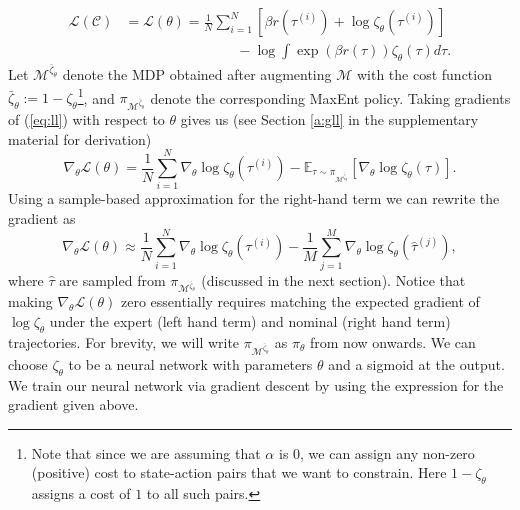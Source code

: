 \documentclass{article}
\begin{document}
\begin{equation}
    \begin{split}
        \mathcal{L}(\mathcal{C})
        &= \mathcal{L}(\theta)
        = \frac{1}{N}\sum_{i=1}^N\left[\beta r(\tau^{(i)}) + \log \zeta_\theta(\tau^{(i)})\right] \\&\qquad\qquad\qquad\qquad-\log\int\exp(\beta r(\tau))\zeta_\theta(\tau)d\tau.
    \end{split}
	\label{eq:ll}
\end{equation}
Let $\mathcal{M}^{\bar{\zeta}_\theta}$ denote the MDP obtained after augmenting $\mathcal{M}$ with the cost function $\bar{\zeta}_\theta := 1-\zeta_\theta$\footnote{Note that since we are assuming that $\alpha$ is $0$, we can assign any non-zero (positive) cost to state-action pairs that we want to constrain. Here $1-\zeta_\theta$ assigns a cost of $1$ to all such pairs.}, and $\pi_{\mathcal{M}^{\bar{\zeta}_\theta}}$ denote the corresponding MaxEnt policy. Taking gradients of (\ref{eq:ll}) with respect to $\theta$ gives us (see Section \ref*{a:gll} in the supplementary material for derivation)
\begin{equation}
        \nabla_\theta\mathcal{L}(\theta) = \frac{1}{N}\sum_{i=1}^N\nabla_\theta \log \zeta_\theta(\tau^{(i)}) - \mathbb{E}_{\tau \sim \pi_{\mathcal{M}^{\bar{\zeta}_\theta}}}\left[\nabla_\theta \log \zeta_\theta(\tau)\right].
    \label{eq:grad_theta_exact}
\end{equation}
Using a sample-based approximation for the right-hand term we can rewrite the gradient as
\begin{equation}
  \nabla_\theta\mathcal{L}(\theta) \approx \frac{1}{N}\sum_{i=1}^N\nabla_\theta \log \zeta_\theta(\tau^{(i)}) - \frac{1}{M}\sum_{j=1}^M\nabla_\theta \log \zeta_\theta(\hat{\tau}^{(j)}),
  \label{eq:grad_theta}
\end{equation}
where $\hat{\tau}$ are sampled from $\pi_{\mathcal{M}^{\bar{\zeta}_\theta}}$ (discussed in the next section). Notice that making $\nabla_\theta \mathcal{L}(\theta)$ zero essentially requires matching the expected gradient of $\log \zeta_\theta$ under the expert (left hand term) and nominal (right hand term) trajectories. For brevity, we will write $\pi_{\mathcal{M}^{\bar{\zeta}_\theta}}$ as $\pi_{\theta}$ from now onwards. We can choose $\zeta_\theta$ to be a neural network with parameters $\theta$ and a sigmoid at the output. We train our neural network via gradient descent by using the expression for the gradient given above.
\end{document}
